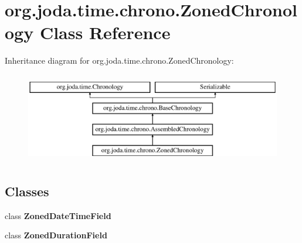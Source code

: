 \hypertarget{classorg_1_1joda_1_1time_1_1chrono_1_1_zoned_chronology}{\section{org.\-joda.\-time.\-chrono.\-Zoned\-Chronology Class Reference}
\label{classorg_1_1joda_1_1time_1_1chrono_1_1_zoned_chronology}
}
Inheritance diagram for org.\-joda.\-time.\-chrono.\-Zoned\-Chronology\-:\begin{figure}[H]
\begin{center}
\leavevmode
\includegraphics[height=4.000000cm]{classorg_1_1joda_1_1time_1_1chrono_1_1_zoned_chronology}
\end{center}
\end{figure}
\subsection*{Classes}
\begin{DoxyCompactItemize}
\item 
class {\bfseries Zoned\-Date\-Time\-Field}
\item 
class {\bfseries Zoned\-Duration\-Field}
\end{DoxyCompactItemize}
